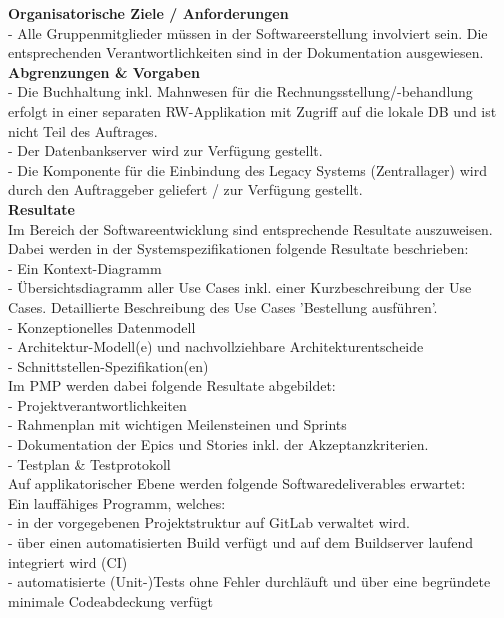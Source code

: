 \documentclass[a4paper, 10pt, fleqn]{article}
\begin{document}
\textbf{Organisatorische Ziele / Anforderungen}\\
- Alle Gruppenmitglieder müssen in der Softwareerstellung involviert sein. Die entsprechenden Verantwortlichkeiten sind in der Dokumentation ausgewiesen.\\

\textbf{Abgrenzungen \& Vorgaben}\\
- Die Buchhaltung inkl. Mahnwesen für die Rechnungsstellung/-behandlung erfolgt in einer separaten RW-Applikation mit Zugriff auf die lokale DB und ist nicht Teil des Auftrages.\\
- Der Datenbankserver wird zur Verfügung gestellt.\\
- Die Komponente für die Einbindung des Legacy Systems (Zentrallager) wird durch den Auftraggeber geliefert / zur Verfügung gestellt.\\

\textbf{Resultate}\\
Im Bereich der Softwareentwicklung sind entsprechende Resultate auszuweisen. Dabei werden in der Systemspezifikationen folgende Resultate beschrieben:\\
- Ein Kontext-Diagramm\\
- Übersichtsdiagramm aller Use Cases inkl. einer Kurzbeschreibung der Use Cases. Detaillierte Beschreibung des Use Cases 'Bestellung ausführen'.\\
- Konzeptionelles Datenmodell\\
- Architektur-Modell(e) und nachvollziehbare Architekturentscheide\\
- Schnittstellen-Spezifikation(en)\\

Im PMP werden dabei folgende Resultate abgebildet:\\
- Projektverantwortlichkeiten\\
- Rahmenplan mit wichtigen Meilensteinen und Sprints\\
- Dokumentation der Epics und Stories inkl. der Akzeptanzkriterien.\\
- Testplan \& Testprotokoll\\

Auf applikatorischer Ebene werden folgende Softwaredeliverables erwartet:\\
Ein lauffähiges Programm, welches:\\
- in der vorgegebenen Projektstruktur auf GitLab verwaltet wird.\\
- über einen automatisierten Build verfügt und auf dem Buildserver laufend integriert wird (CI)\\
- automatisierte (Unit-)Tests ohne Fehler durchläuft und über eine begründete minimale Codeabdeckung verfügt\\
\end{document}
